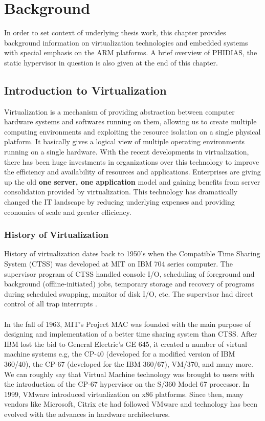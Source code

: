 \chapter{Background \label{cha:chapter2}}

In order to set context of underlying thesis work, this chapter provides background information on virtualization technologies and embedded systems with special emphasis on the ARM platforms. A brief overview of PHIDIAS, the static hypervisor in question is also given at the end of this chapter.

\section{Introduction to Virtualization \label{sec:tech}}
Virtualization is a mechanism of providing abstraction between computer hardware systems and softwares running on them, allowing us to create multiple computing environments and exploiting the resource isolation on a single physical platform. It basically gives a logical view of multiple operating environments running on a single hardware. With the recent developments in virtualization, there has been huge investments in organizations over this technology to improve the efficiency and availability of resources and applications. Enterprises are giving up the old \textbf{one server, one application} model and gaining benefits from server consolidation provided by virtualization. This technology has dramatically changed the IT landscape by reducing underlying expenses and providing economies of scale and greater efficiency.

\subsection{History of Virtualization\label{sec:history}}
History of virtualization dates back to 1950's when the Compatible Time Sharing System (CTSS) was developed at MIT on IBM 704 series computer. The supervisor program of CTSS handled console I/O, scheduling of foreground and background (offline-initiated) jobs, temporary storage and recovery of programs during scheduled swapping, monitor of disk I/O, etc. The supervisor had direct control of all trap interrupts \cite{introtousevirtualization}.\\
\\
In the fall of 1963, MIT's Project MAC was founded with the main purpose of designing and implementation of a better time sharing system than CTSS. After IBM lost the bid to General Electric's GE 645, it created a number of virtual machine systems e.g, the CP-40 (developed for a modified version of IBM 360/40), the CP-67 (developed for the IBM 360/67), VM/370, and many more. We can roughly say that Virtual Machine technology was brought to users with the introduction of the CP-67 hypervisor on the S/360 Model 67 processor. In 1999, VMware introduced virtualization on x86 platforms. Since then, many vendors like Microsoft, Citrix etc had followed VMware and technology has been evolved with the advances in hardware architectures. 
\\
\\
